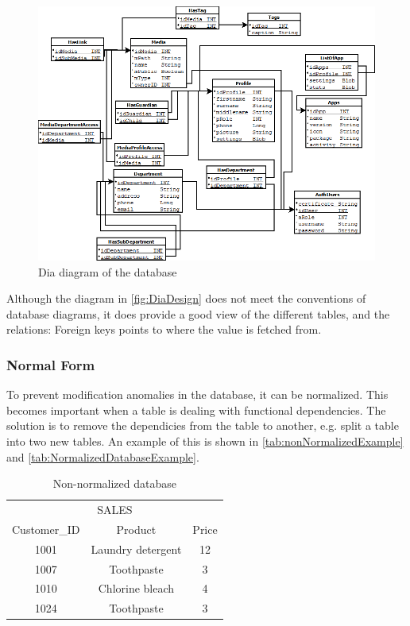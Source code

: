 \begin{figure}[htbp]
	\centering
		\includegraphics[width=1.00\textwidth]{images/DiaDesign.png}
	\caption{Dia diagram of the database}
	\label{fig:DiaDesign}
\end{figure}

Although the diagram in \autoref{fig:DiaDesign} does not meet the conventions of database diagrams, it does provide a good view of the different tables, and the relations: Foreign keys points to where the value is fetched from.

\subsubsection{Normal Form}
To prevent modification anomalies in the database, it can be normalized. This becomes important when a table is dealing with functional dependencies. The solution is to remove the dependicies from the table to another, e.g. split a table into two new tables. An example of this is shown in \autoref{tab:nonNormalizedExample} and \autoref{tab:NormalizedDatabaseExample}.

\begin{table}[htbp]
	\centering
		\begin{tabular}{|c|c|c|}
		\hline
		 \multicolumn{3}{|c|}{SALES}\\
		\multicolumn{1}{|c}{Customer\_ID} & \multicolumn{1}{c}{Product} & \multicolumn{1}{c|}{Price} \\
		\hline
		1001 & Laundry detergent & 12 \\ \hline
		1007 & Toothpaste & 3 \\ \hline
		1010 & Chlorine bleach & 4 \\ \hline
		1024 & Toothpaste & 3\\	\hline
		\end{tabular}
	\caption{Non-normalized database\cite[p. 114]{sqlForDummies}}
	\label{tab:nonNormalizedExample}
\end{table}

